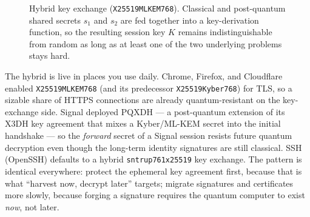 \begin{figure}[H]
\centering
{}
\caption{Hybrid key exchange (\texttt{X25519MLKEM768}). Classical and post-quantum shared secrets $s_1$ and $s_2$ are fed together into a key-derivation function, so the resulting session key $K$ remains indistinguishable from random as long as at least one of the two underlying problems stays hard.}
\label{ch35:fig-hybrid-kdf}
\end{figure}

\begin{applicationbox}
The hybrid is live in places you use daily. Chrome, Firefox, and Cloudflare enabled \texttt{X25519MLKEM768} (and its predecessor \texttt{X25519Kyber768}) for TLS, so a sizable share of HTTPS connections are already quantum-resistant on the key-exchange side. Signal deployed PQXDH --- a post-quantum extension of its X3DH key agreement that mixes a Kyber/ML-KEM secret into the initial handshake --- so the \emph{forward} secret of a Signal session resists future quantum decryption even though the long-term identity signatures are still classical. SSH (OpenSSH) defaults to a hybrid \texttt{sntrup761x25519} key exchange. The pattern is identical everywhere: protect the ephemeral key agreement first, because that is what ``harvest now, decrypt later'' targets; migrate signatures and certificates more slowly, because forging a signature requires the quantum computer to exist \emph{now}, not later.
\end{applicationbox}

